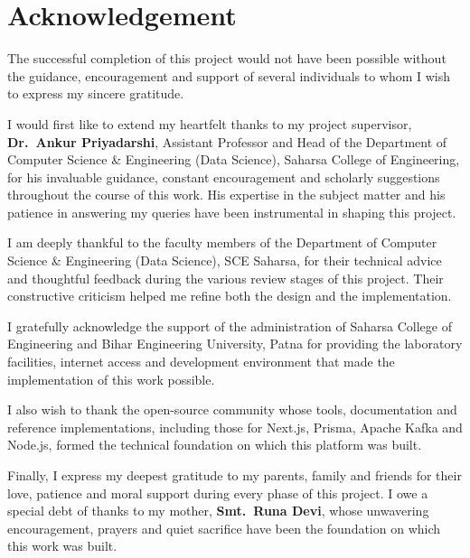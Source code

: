 \documentclass[12pt, a4paper, oneside]{report}
\begin{document}
\chapter*{Acknowledgement}
\thispagestyle{plain}
{

The successful completion of this project would not have been possible without the guidance, encouragement and support of several individuals to whom I wish to express my sincere gratitude.

I would first like to extend my heartfelt thanks to my project supervisor, \textbf{Dr.\ Ankur Priyadarshi}, Assistant Professor and Head of the Department of Computer Science \& Engineering (Data Science), Saharsa College of Engineering, for his invaluable guidance, constant encouragement and scholarly suggestions throughout the course of this work. His expertise in the subject matter and his patience in answering my queries have been instrumental in shaping this project.

I am deeply thankful to the faculty members of the Department of Computer Science \& Engineering (Data Science), SCE Saharsa, for their technical advice and thoughtful feedback during the various review stages of this project. Their constructive criticism helped me refine both the design and the implementation.

I gratefully acknowledge the support of the administration of Saharsa College of Engineering and Bihar Engineering University, Patna for providing the laboratory facilities, internet access and development environment that made the implementation of this work possible.

I also wish to thank the open-source community whose tools, documentation and reference implementations, including those for Next.js, Prisma, Apache Kafka and Node.js, formed the technical foundation on which this platform was built.

Finally, I express my deepest gratitude to my parents, family and friends for their love, patience and moral support during every phase of this project. I owe a special debt of thanks to my mother, \textbf{Smt.\ Runa Devi}, whose unwavering encouragement, prayers and quiet sacrifice have been the foundation on which this work was built.

}%

\clearpage

\end{document}
